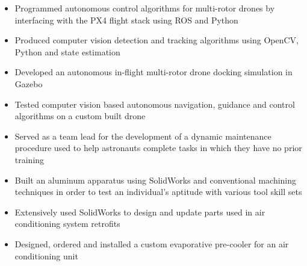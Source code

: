 \documentclass[10pt,ragged2e]{altacv}
\begin{document}

\begin{fullwidth}
  \makecvheader
\end{fullwidth}



\begin{itemize}
  \item Programmed autonomous control algorithms for multi-rotor drones by interfacing with the PX4 flight stack using ROS and Python 
  \item Produced computer vision detection and tracking algorithms using OpenCV, Python and state estimation
  \item Developed an autonomous in-flight multi-rotor drone docking simulation in Gazebo
  \item Tested computer vision based autonomous navigation, guidance and control algorithms on a custom built drone
\end{itemize}

\begin{itemize}
  \item Served as a team lead for the development of a dynamic maintenance procedure used to help astronauts complete tasks in which they have no prior training 
  \item Built an aluminum apparatus using SolidWorks and conventional machining techniques in order to test an individual’s aptitude with various tool skill sets
\end{itemize}

\divider

\begin{itemize}
  \item Extensively used SolidWorks to design and update parts used in air conditioning system retrofits
  \item Designed, ordered and installed a custom evaporative pre-cooler for an air conditioning unit
\end{itemize}
\end{document}
